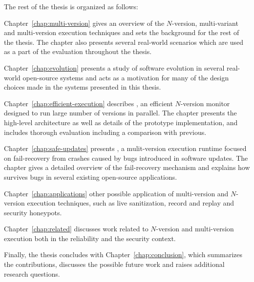The rest of the thesis is organized as follows:

\begin{chapterdescription}
\item[Chapter~\ref{chap:multi-version}] gives an overview of the $N$-version,
multi-variant and multi-version execution techniques and sets the background
for the rest of the thesis. The chapter also presents several real-world scenarios
which are used as a part of the evaluation throughout the thesis.

\item[Chapter~\ref{chap:evolution}] presents a study of software evolution in several
real-world open-source systems and acts as a motivation for many of the design
choices made in the systems presented in this thesis.

\item[Chapter~\ref{chap:efficient-execution}] describes \varan, an efficient $N$-version
monitor designed to run large number of versions in parallel. The chapter presents
the high-level architecture as well as details of the prototype implementation,
and includes thorough evaluation including a comparison with previous.

\item[Chapter~\ref{chap:safe-updates}] presents \mx, a mulit-version execution runtime focused
on fail-recovery from crashes caused by bugs introduced in software updates. The chapter
gives a detailed overview of the fail-recovery mechanism and explains how \mx survives
bugs in several existing open-source applications.

\item[Chapter~\ref{chap:applications}] other possible application of multi-version and $N$-version
execution techniques, such as live sanitization, record and replay and security honeypots.

\item[Chapter~\ref{chap:related}] discusses work related to $N$-version and multi-version
execution both in the reliability and the security context.
\end{chapterdescription}

Finally, the thesis concludes with Chapter~\ref{chap:conclusion}, which
summarizes the contributions, discusses the possible future work and raises
additional research questions.


